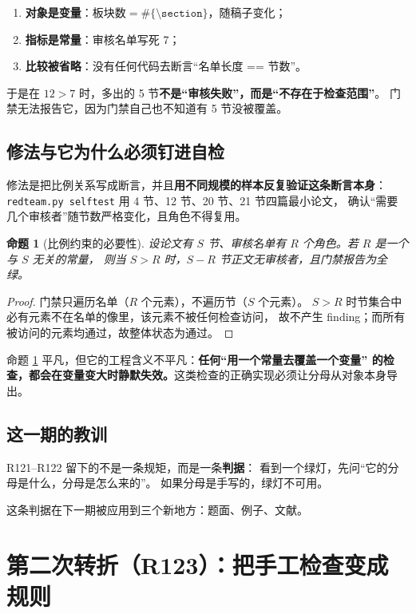 \documentclass[11pt,a4paper]{article}
\newtheorem{proposition}{命题}
\newcommand{\code}[1]{\texttt{#1}}
\begin{document}
\begin{enumerate}[leftmargin=1.6em,itemsep=2pt]
\item \textbf{对象是变量}：$\text{板块数} = \#\{\code{\textbackslash section}\}$，随稿子变化；
\item \textbf{指标是常量}：审核名单写死 7；
\item \textbf{比较被省略}：没有任何代码去断言“名单长度 == 节数”。
\end{enumerate}

于是在 $12 > 7$ 时，多出的 5 节\textbf{不是“审核失败”，而是“不存在于检查范围”}。
门禁无法报告它，因为门禁自己也不知道有 5 节没被覆盖。

\subsection{修法与它为什么必须钉进自检}
修法是把比例关系写成断言，并且\textbf{用不同规模的样本反复验证这条断言本身}：
\code{redteam.py selftest} 用 4 节、12 节、20 节、21 节四篇最小论文，
确认“需要几个审核者”随节数严格变化，且角色不得复用。

\begin{proposition}[比例约束的必要性]\label{prop:ratio}
设论文有 $S$ 节、审核名单有 $R$ 个角色。若 $R$ 是一个与 $S$ 无关的常量，
则当 $S > R$ 时，$S - R$ 节正文无审核者，且门禁报告为全绿。
\end{proposition}

\begin{proof}
门禁只遍历名单（$R$ 个元素），不遍历节（$S$ 个元素）。
$S > R$ 时节集合中必有元素不在名单的像里，该元素不被任何检查访问，
故不产生 finding；而所有被访问的元素均通过，故整体状态为通过。
\end{proof}

命题 \ref{prop:ratio} 平凡，但它的工程含义不平凡：\textbf{任何“用一个常量去覆盖一个变量”
的检查，都会在变量变大时静默失效。}这类检查的正确实现必须让分母从对象本身导出。

\subsection{这一期的教训}
R121--R122 留下的不是一条规矩，而是一条\textbf{判据}：
看到一个绿灯，先问“它的分母是什么，分母是怎么来的”。
如果分母是手写的，绿灯不可用。

这条判据在下一期被应用到三个新地方：题面、例子、文献。

\section{第二次转折（R123）：把手工检查变成规则}\label{sec:r123}
\end{document}
